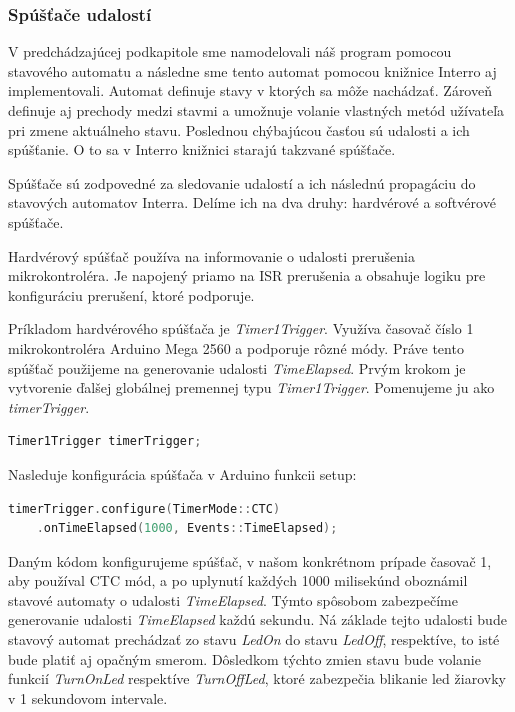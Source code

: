 \subsubsection{Spúšťače udalostí}
V predchádzajúcej podkapitole sme namodelovali náš program pomocou stavového automatu a následne sme tento automat pomocou knižnice Interro aj implementovali.
Automat definuje stavy v ktorých sa môže nachádzať. Zároveň definuje aj prechody medzi stavmi a umožnuje volanie vlastných metód užívateľa pri zmene aktuálneho stavu.
Poslednou chýbajúcou časťou sú udalosti a ich spúšťanie. O to sa v Interro knižnici starajú takzvané spúšťače. \par
Spúšťače sú zodpovedné za sledovanie udalostí a ich následnú propagáciu do stavových automatov Interra. Delíme ich na dva druhy: hardvérové a softvérové spúšťače. \par
Hardvérový spúšťač používa na informovanie o udalosti prerušenia mikrokontroléra. Je napojený priamo na ISR prerušenia a obsahuje logiku pre konfiguráciu prerušení,
ktoré podporuje. \par
Príkladom hardvérového spúšťača je \textit{Timer1Trigger}. Využíva časovač číslo 1 mikrokontroléra Arduino Mega 2560 a podporuje rôzné módy.
Práve tento spúšťač použijeme na generovanie udalosti \textit{TimeElapsed}. Prvým krokom je vytvorenie ďalšej globálnej premennej typu \textit{Timer1Trigger}.
Pomenujeme ju ako \textit{timerTrigger}.
\begin{lstlisting}[language=c++]  
Timer1Trigger timerTrigger;            
\end{lstlisting}

Nasleduje konfigurácia spúšťača v Arduino funkcii setup:
\begin{lstlisting}[language=c++]  
timerTrigger.configure(TimerMode::CTC)
    .onTimeElapsed(1000, Events::TimeElapsed); 
\end{lstlisting}

Daným kódom konfigurujeme spúšťač, v našom konkrétnom prípade časovač 1, aby používal CTC mód, a po uplynutí každých 1000 milisekúnd oboznámil stavové automaty
o udalosti \textit{TimeElapsed}. Týmto spôsobom zabezpečíme generovanie udalosti \textit{TimeElapsed} každú sekundu. Ná základe tejto udalosti bude stavový automat
prechádzať zo stavu \textit{LedOn} do stavu \textit{LedOff}, respektíve, to isté bude platiť aj opačným smerom. Dôsledkom týchto zmien stavu bude volanie funkcií
\textit{TurnOnLed} respektíve \textit{TurnOffLed}, ktoré zabezpečia blikanie led žiarovky v 1 sekundovom intervale.  \par


